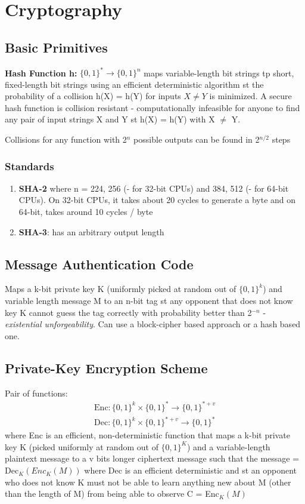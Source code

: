 \documentclass{article}
\begin{document}
\section{Cryptography}
\subsection{Basic Primitives}
\textbf{Hash Function h:} $\{0, 1\} ^{*} \rightarrow \{0, 1\}^{n}$ maps variable-length bit strings tp short, fixed-length bit strings using an efficient deterministic algorithm st the probability of a collision h(X) = h(Y) for inputs $X \neq Y$ is minimized. A secure hash function is collision resistant - computationally infeasible for anyone to find any pair of input strings X and Y st h(X) = h(Y) with X $\neq$ Y. 

Collisions for any function with 2$^{n}$ possible outputs can be found in 2$^{n/2}$ steps

\subsubsection{Standards}
\begin{enumerate}
	\item \textbf{SHA-2} where n = 224, 256 (- for 32-bit CPUs) and 384, 512 (- for 64-bit CPUs). On 32-bit CPUs, it takes about 20 cycles to generate a byte and on 64-bit, takes around 10 cycles / byte
	\item \textbf{SHA-3}: has an arbitrary output length
\end{enumerate}

\subsection{Message Authentication Code}
Maps a k-bit private key K (uniformly picked at random out of $\{0, 1\}^{k}$) and variable length message M to an n-bit tag st any opponent that does not know key K cannot guess the tag correctly with probability better than 2$^{-n}$ - \textit{existential unforgeability}. Can use a block-cipher based approach or a hash based one.

\subsection{Private-Key Encryption Scheme}
Pair of functions:
$$\begin{array}{l}{\mathrm{Enc} :\{0,1\}^{k} \times\{0,1\}^{*} \rightarrow\{0,1\}^{*+v}} \\ {\mathrm{Dec} :\{0,1\}^{k} \times\{0,1\}^{*+v} \rightarrow\{0,1\}^{*}}\end{array}$$
where Enc is an efficient, non-deterministic function that maps a k-bit private key K (picked uniformly at random out of $\{0, 1\}^{K}$) and a variable-length plaintext message to a v bits longer ciphertext message such that the message = Dec$_{K}(Enc_{K}(M))$ where Dec is an efficient deterministic and st an opponent who does not know K must not be able to learn anything new about M (other than the length of M) from being able to observe C = Enc$_{K}(M)$
\end{document}
